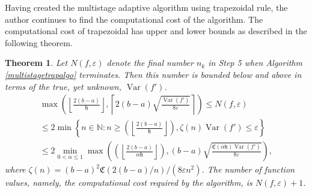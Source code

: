 \documentclass{iitthesis}
\DeclareMathOperator{\Var}{Var}
\newtheorem{theorem}{Theorem}
\theoremstyle{definition}
\theoremstyle{remark}
\begin{document}
Having created the multistage adaptive algorithm using trapezoidal rule, the author continues to find the computational cost of the algorithm. The computational cost of trapezoidal has upper and lower bounds as described in the following theorem.
\begin{theorem}\label{uppbndcosttrap}
    Let $N(f,\varepsilon)$ denote the final number $n_k$ in Step 5 when Algorithm \ref{multistagetrapalgo} terminates. Then this number is bounded below and above in terms of the true, yet unknown, $\Var(f')$.
    \begin{multline}\label{uppbndcosttrapineq}
        \max\left(\left\lfloor\frac{2(b-a)}{\mathfrak{h}}\right\rfloor,\left\lceil2(b-a)\sqrt{\frac{\Var(f')}{8\varepsilon}}\right\rceil\right)\leq N(f,\varepsilon)\\ \leq 2\min\left\{n\in\mathbb{N}:n\geq\left(\left\lfloor\frac{2(b-a)}{\mathfrak{h}}\right\rfloor\right),\zeta(n)\Var(f')\leq\varepsilon\right\}\\ \leq 2\min_{0<\alpha\leq1}\max\left(\left(\left\lfloor\frac{2(b-a)}{\alpha\mathfrak{h}}\right\rfloor\right),(b-a)\sqrt{\frac{\mathfrak{C}(\alpha\mathfrak{h})\Var(f')}{8\varepsilon}}\right),
    \end{multline}
    where $\zeta(n)=(b-a)^2\mathfrak{C}(2(b-a)/n)/(8\varepsilon n^2)$. The number of function values, namely, the computational cost required by the algorithm, is $N(f,\varepsilon)+1$.
\end{theorem}
\end{document}
